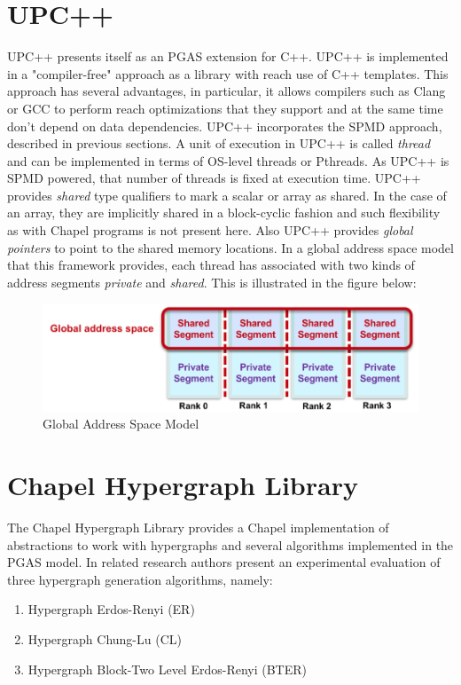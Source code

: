 \documentclass[14pt]{extreport}
\begin{document}
\section{UPC++}
UPC++\cite{upcpp} presents itself as an PGAS extension for C++. UPC++ is implemented in a "compiler-free" approach as a library with reach use of C++ templates. This approach has several advantages, in particular, it allows compilers such as Clang or GCC to perform reach optimizations that they support and at the same time don't depend on data dependencies.
UPC++ incorporates the SPMD approach, described in previous sections. A unit of execution in UPC++ is called \textit{thread} and can be implemented in terms of OS-level threads or Pthreads. As UPC++ is SPMD powered, that number of threads is fixed at execution time.
UPC++ provides \textit{shared} type qualifiers to mark a scalar or array as shared. In the case of an array, they are implicitly shared in a block-cyclic fashion and such flexibility as with Chapel programs is not present here. Also UPC++ provides \textit{global pointers} to point to the shared memory locations. In a global address space model that this framework provides, each thread has associated with two kinds of address segments \textit{private} and \textit{shared}. This is illustrated in the figure below:
\begin{figure}[H]
	\centering
	\includegraphics[scale=0.75]{images/global_address_space.png}
	\caption{Global Address Space Model}
\end{figure}

\section{Chapel Hypergraph Library}
The Chapel Hypergraph Library provides a Chapel implementation of abstractions to work with hypergraphs and several algorithms implemented in the PGAS model. In related research \cite{chgl} authors present an experimental evaluation of three hypergraph generation algorithms, namely:

\begin{enumerate}
	\item Hypergraph Erdos-Renyi (ER)
	\item Hypergraph Chung-Lu (CL)
	\item Hypergraph Block-Two Level Erdos-Renyi (BTER)
\end{enumerate}
\end{document}
